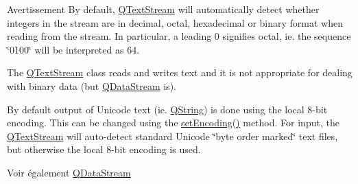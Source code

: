 \begin{DoxyWarning}{Avertissement}
By default, \hyperlink{class_q_text_stream}{Q\+Text\+Stream} will automatically detect whether integers in the stream are in decimal, octal, hexadecimal or binary format when reading from the stream. In particular, a leading \textquotesingle{}0\textquotesingle{} signifies octal, ie. the sequence \char`\"{}0100\char`\"{} will be interpreted as 64.
\end{DoxyWarning}
The \hyperlink{class_q_text_stream}{Q\+Text\+Stream} class reads and writes text and it is not appropriate for dealing with binary data (but \hyperlink{class_q_data_stream}{Q\+Data\+Stream} is).

By default output of Unicode text (ie. \hyperlink{class_q_string}{Q\+String}) is done using the local 8-\/bit encoding. This can be changed using the \hyperlink{class_q_text_stream_ad06dc1f99476aed01fa8a822e871dc44}{set\+Encoding()} method. For input, the \hyperlink{class_q_text_stream}{Q\+Text\+Stream} will auto-\/detect standard Unicode \char`\"{}byte order marked\char`\"{} text files, but otherwise the local 8-\/bit encoding is used.

\begin{DoxySeeAlso}{Voir également}
\hyperlink{class_q_data_stream}{Q\+Data\+Stream} 
\end{DoxySeeAlso}


